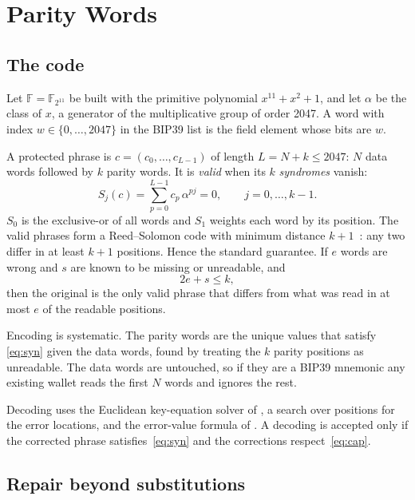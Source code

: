 \documentclass[numeric]{anvil-paper}
\newcommand{\F}{\mathbb{F}}
\begin{document}
\section{Parity Words}
\label{sec:parity}

\subsection{The code}

Let $\F=\F_{2^{11}}$ be built with the primitive polynomial $x^{11}+x^2+1$, and
let $\alpha$ be the class of $x$, a generator of the multiplicative group of
order 2047. A word with index $w\in\{0,\dots,2047\}$ in the BIP39 list is the
field element whose bits are $w$.

A protected phrase is $c=(c_0,\dots,c_{L-1})$ of length $L=N+k\le 2047$: $N$
data words followed by $k$ parity words. It is \emph{valid} when its $k$
\emph{syndromes} vanish:
\begin{equation}
S_j(c)=\sum_{p=0}^{L-1} c_p\,\alpha^{pj}=0,\qquad j=0,\dots,k-1 .
\label{eq:syn}
\end{equation}
$S_0$ is the exclusive-or of all words and $S_1$ weights each word by its
position. The valid phrases form a Reed--Solomon code with minimum distance
$k+1$~\citep{reed1960polynomial}: any two differ in at least $k+1$ positions.
Hence the standard guarantee. If $e$ words are wrong and $s$ are known to be
missing or unreadable, and
\begin{equation}
2e+s\le k ,
\label{eq:cap}
\end{equation}
then the original is the only valid phrase that differs from what was read in
at most $e$ of the readable positions.

Encoding is systematic. The parity words are the unique values that satisfy
\eqref{eq:syn} given the data words, found by treating the $k$ parity positions
as unreadable. The data words are untouched, so if they are a BIP39 mnemonic
any existing wallet reads the first $N$ words and ignores the rest.

Decoding uses the Euclidean key-equation solver of \citet{sugiyama1975method},
a search over positions for the error locations, and the error-value formula of
\citet{forney1965decoding}. A decoding is accepted only if the corrected phrase
satisfies~\eqref{eq:syn} and the corrections respect~\eqref{eq:cap}.

\subsection{Repair beyond substitutions}
\end{document}
